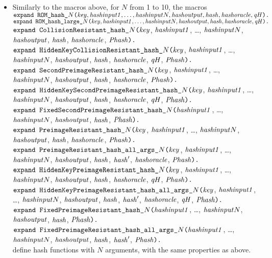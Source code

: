 \documentclass{article}
\begin{document}
\begin{itemize}
  \item Similarly to the macros above, for $N$ from 1 to 10, the macros\\
   $\texttt{expand ROM\_hash\_$N$(}\mathit{key}, \mathit{hashinput1}, \dots, \mathit{hashinput}N, \mathit{hashoutput}, \mathit{hash}, \mathit{hashoracle}, \mathit{qH}\texttt{).}$\\
   $\texttt{expand ROM\_hash\_large\_$N$(}\mathit{key}, \mathit{hashinput1}, \dots, \mathit{hashinput}N, \mathit{hashoutput}, \mathit{hash}, \mathit{hashoracle}, \mathit{qH}\texttt{).}$\\
   $\texttt{expand CollisionResistant\_hash\_$N$(}\mathit{key}$, $\mathit{hashinput1}$, \dots, $\mathit{hashinput}N$, $\mathit{hashoutput}$, $\mathit{hash}$, $\mathit{hashoracle}$, $\mathit{Phash}\texttt{).}$\\
   $\texttt{expand HiddenKeyCollisionResistant\_hash\_$N$(}\mathit{key}$, $\mathit{hashinput1}$, \dots, $\mathit{hashinput}N$, $\mathit{hashoutput}$, $\mathit{hash}$, $\mathit{hashoracle}$, $\mathit{qH}$, $\mathit{Phash}\texttt{).}$\\
   $\texttt{expand SecondPreimageResistant\_hash\_$N$(}\mathit{key}$, $\mathit{hashinput1}$, \dots, $\mathit{hashinput}N$, $\mathit{hashoutput}$, $\mathit{hash}$, $\mathit{hashoracle}$, $\mathit{Phash}\texttt{).}$\\
   $\texttt{expand HiddenKeySecondPreimageResistant\_hash\_$N$(}\mathit{key}$, $\mathit{hashinput1}$, \dots, $\mathit{hashinput}N$, $\mathit{hashoutput}$, $\mathit{hash}$, $\mathit{hashoracle}$, $\mathit{qH}$, $\mathit{Phash}\texttt{).}$\\
   $\texttt{expand FixedSecondPreimageResistant\_hash\_$N$(}\mathit{hashinput1}$, \dots, $\mathit{hashinput}N$, $\mathit{hashoutput}$, $\mathit{hash}$, $\mathit{Phash}\texttt{).}$\\
   $\texttt{expand PreimageResistant\_hash\_$N$(}\mathit{key}$, $\mathit{hashinput1}$, \dots, $\mathit{hashinput}N$, $\mathit{hashoutput}$, $\mathit{hash}$, $\mathit{hashoracle}$, $\mathit{Phash}\texttt{).}$\\
   $\texttt{expand PreimageResistant\_hash\_all\_args\_$N$(}\mathit{key}$, $\mathit{hashinput1}$, \dots, $\mathit{hashinput}N$, $\mathit{hashoutput}$, $\mathit{hash}$, $\mathit{hash}'$, $\mathit{hashoracle}$, $\mathit{Phash}\texttt{).}$\\
   $\texttt{expand HiddenKeyPreimageResistant\_hash\_$N$(}\mathit{key}$, $\mathit{hashinput1}$, \dots, $\mathit{hashinput}N$, $\mathit{hashoutput}$, $\mathit{hash}$, $\mathit{hashoracle}$, $\mathit{qH}$, $\mathit{Phash}\texttt{).}$\\
   $\texttt{expand HiddenKeyPreimageResistant\_hash\_all\_args\_$N$(}\mathit{key}$, $\mathit{hashinput1}$, \dots, $\mathit{hashinput}N$, $\mathit{hashoutput}$, $\mathit{hash}$, $\mathit{hash}'$, $\mathit{hashoracle}$, $\mathit{qH}$, $\mathit{Phash}\texttt{).}$\\
   $\texttt{expand FixedPreimageResistant\_hash\_$N$(}\mathit{hashinput1}$, \dots, $\mathit{hashinput}N$, $\mathit{hashoutput}$, $\mathit{hash}$, $\mathit{Phash}\texttt{).}$\\
   $\texttt{expand FixedPreimageResistant\_hash\_all\_args\_$N$(}\mathit{hashinput1}$, \dots, $\mathit{hashinput}N$, $\mathit{hashoutput}$, $\mathit{hash}$, $\mathit{hash}'$, $\mathit{Phash}\texttt{).}$\\
   define hash functions with $N$ arguments, with the same properties as above.


\end{itemize}
\end{document}
